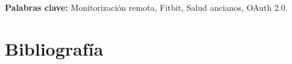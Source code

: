 \documentclass[12pt, a4paper, oneside]{book}
\begin{document}
\vspace{1cm} %
\textbf{Palabras clave:} Monitorización remota, Fitbit, Salud ancianos, OAuth 2.0. 

\tableofcontents










\cleardoublepage
{}
\chapter*{Bibliografía}
\cleardoublepage
\appendix %
\begin{appendices} %

 








\end{appendices}
\end{document}
